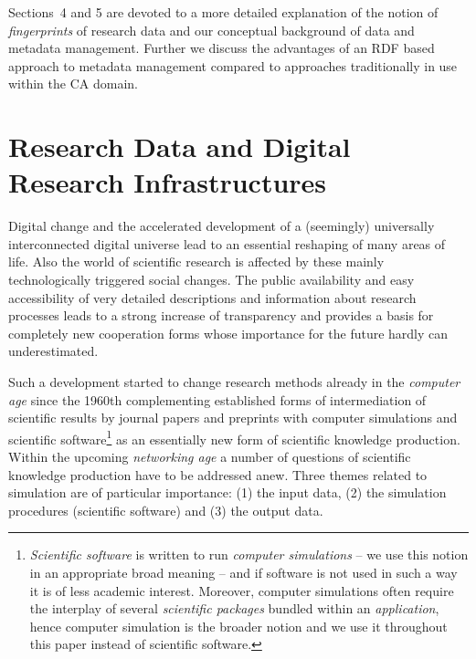 \documentclass[runningheads,a4paper]{llncs}
\begin{document}
Sections~4 and 5 are devoted to a more detailed explanation of the notion of
\emph{fingerprints} of research data and our conceptual background of data and
metadata management.  Further we discuss the advantages of an RDF based
approach to metadata management compared to approaches traditionally in use
within the CA domain.

\section{Research Data and Digital Research Infrastructures}

Digital change and the accelerated development of a (seemingly) universally
interconnected digital universe lead to an essential reshaping of many areas of
life.  Also the world of scientific research is affected by these mainly
technologically triggered social changes. The public availability and easy
accessibility of very detailed descriptions and information about research
processes leads to a strong increase of transparency and provides a basis for
completely new cooperation forms whose importance for the future hardly can
underestimated.

Such a development started to change research methods already in the
\emph{computer age} since the 1960th complementing established forms of
intermediation of scientific results by journal papers and preprints with
computer simulations and scientific software\footnote{\emph{Scientific
    software} is written to run \emph{computer simulations} -- we use this
  notion in an appropriate broad meaning -- and if software is not used in such
  a way it is of less academic interest. Moreover, computer simulations often
  require the interplay of several \emph{scientific packages} bundled within an
  \emph{application}, hence computer simulation is the broader notion and we
  use it throughout this paper instead of scientific software.} as an
essentially new form of scientific knowledge production.  Within the upcoming
\emph{networking age} a number of questions of scientific knowledge production
have to be addressed anew. Three themes related to simulation are of particular
importance: (1) the input data, (2) the simulation procedures (scientific
software) and (3) the output data.
\end{document}
